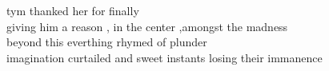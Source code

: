 tym thanked her for finally\\
giving him a reason , in the center ,amongst the madness\\
beyond this everthing rhymed of plunder\\
imagination curtailed and sweet instants losing their immanence\\

